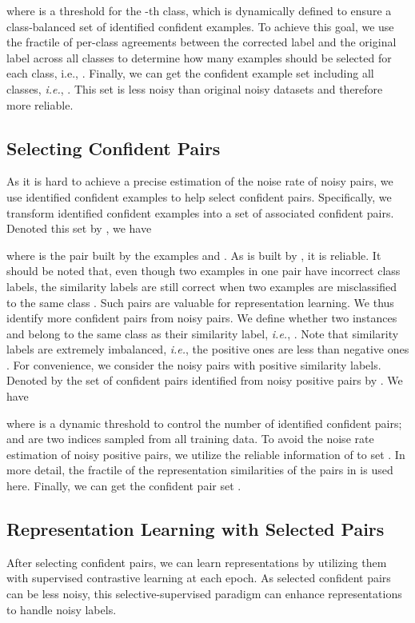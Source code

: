 \documentclass[10pt,twocolumn,letterpaper]{article}
\begin{document}
where  is a threshold for the -th class, which is dynamically defined to ensure a class-balanced set of identified confident examples. To achieve this goal, we use the  fractile of per-class agreements between the corrected label  and the original label  across all classes to determine how many examples should be selected for each class, i.e., . Finally, we can get the confident example set including all classes, \textit{i.e.}, . This set is less noisy than original noisy datasets and therefore more reliable.

\subsection{Selecting Confident Pairs}
As it is hard to achieve a precise estimation of the noise rate of noisy pairs, we use identified confident examples to help select confident pairs. Specifically, we transform identified confident examples into a set of associated confident pairs.  Denoted this set by , we have 

where  is the pair built by the examples  and . As  is built by , it is reliable. It should be noted that, even though two examples in one pair have incorrect class labels, the similarity labels are still correct when two examples are misclassified to the same class \cite{Wu2021icml}. Such pairs are valuable for representation learning. We thus identify more confident pairs from noisy pairs. We define whether two instances  and  belong to the same class as their similarity label, \textit{i.e.}, . Note that similarity labels are extremely imbalanced, \textit{i.e.}, the positive ones are less than negative ones \cite{Wu2021icml}. For convenience, we consider the noisy pairs with positive similarity labels. Denoted by the set of confident pairs identified from noisy positive pairs by . We have 

where  is a dynamic threshold to control the number of identified confident pairs;  and  are two indices sampled from all training data. To avoid the noise rate estimation of noisy positive pairs, we utilize the reliable information of  to set . In more detail, the  fractile of the representation similarities of the pairs in  is used here. Finally, we can get the confident pair set . 
\subsection{Representation Learning with Selected Pairs}
After selecting confident pairs, we can learn representations by utilizing them with supervised contrastive learning at each epoch. As selected confident pairs can be less noisy, this selective-supervised paradigm can enhance representations to handle noisy labels.
\end{document}
